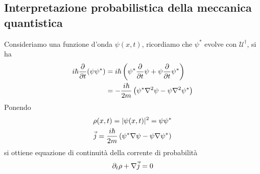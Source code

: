 \documentclass{article}
\begin{document}
\subsection{Interpretazione probabilistica della meccanica quantistica}
Consideriamo una funzione d'onda $\psi(x, t)$, ricordiamo che $\psi^*$ evolve con $\mathcal{U}^\dagger$, si ha
\begin{align}
    i\hbar\frac{\partial}{\partial t}(\psi \psi^*) &= i\hbar\left( \psi^*\frac{\partial}{\partial t}\psi + \psi \frac{\partial}{\partial t}\psi^* \right) \notag \\
    &= -\frac{i\hbar}{2m}\left( \psi^*\nabla^2\psi - \psi \nabla^2\psi^* \right) \notag
\end{align}
Ponendo
\begin{gather}
    \rho(x, t) = |\psi(x, t)|^2 = \psi \psi^* \notag \\
    \vec{j} = \frac{i\hbar}{2m}\left( \psi^*\nabla\psi - \psi\nabla\psi^* \right) \notag
\end{gather}
si ottiene equazione di continuità della corrente di probabilità
\begin{gather}
    \partial_t \rho + \nabla \vec{j} = 0 \notag
\end{gather}
\end{document}

